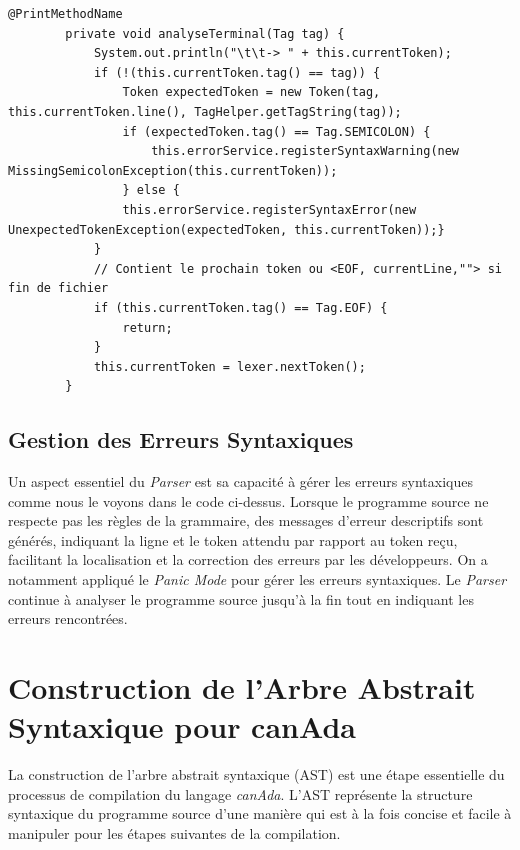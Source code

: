 \documentclass[french,a4paper]{article}
\begin{document}
    \begin{lstlisting}[label={lst:lstlisting11}]
        @PrintMethodName
        private void analyseTerminal(Tag tag) {
            System.out.println("\t\t-> " + this.currentToken);
            if (!(this.currentToken.tag() == tag)) {
                Token expectedToken = new Token(tag, this.currentToken.line(), TagHelper.getTagString(tag));
                if (expectedToken.tag() == Tag.SEMICOLON) {
                    this.errorService.registerSyntaxWarning(new MissingSemicolonException(this.currentToken));
                } else {
                this.errorService.registerSyntaxError(new UnexpectedTokenException(expectedToken, this.currentToken));}
            }
            // Contient le prochain token ou <EOF, currentLine,""> si fin de fichier
            if (this.currentToken.tag() == Tag.EOF) {
                return;
            }
            this.currentToken = lexer.nextToken();
        }
    \end{lstlisting}

    \subsection{Gestion des Erreurs Syntaxiques}\label{subsec:gestion-des-erreurs-syntaxiques}

    Un aspect essentiel du \textit{Parser} est sa capacité à gérer les erreurs syntaxiques comme nous le voyons dans le code ci-dessus.
    Lorsque le programme source ne respecte pas les règles de la grammaire, des messages d'erreur descriptifs sont générés, indiquant la ligne et le token attendu par rapport au token reçu, facilitant la localisation et la correction des erreurs par les développeurs.
    On a notamment appliqué le \textit{Panic Mode} pour gérer les erreurs syntaxiques.
    Le \textit{Parser} continue à analyser le programme source jusqu'à la fin tout en indiquant les erreurs rencontrées.

    \section{Construction de l'Arbre Abstrait Syntaxique pour canAda}\label{sec:construction-de-l'arbre-abstrait-syntaxique-pour-canada}

    La construction de l'arbre abstrait syntaxique (AST) est une étape essentielle du processus de compilation du langage \textit{canAda}.
    L'AST représente la structure syntaxique du programme source d'une manière qui est à la fois concise et facile à manipuler pour les étapes suivantes de la compilation.
\end{document}

